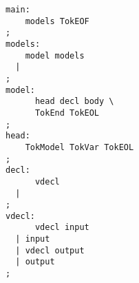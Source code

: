\begin{minipage}[h]{2in}
\scriptsize
\begin{verbatim}
main:
    models TokEOF
;
models:
    model models
  |
;
model:
      head decl body \
      TokEnd TokEOL
;
head:
    TokModel TokVar TokEOL
;
decl:
      vdecl
  |
;
vdecl:
      vdecl input
  | input
  | vdecl output
  | output
;
\end{verbatim}
\end{minipage}
